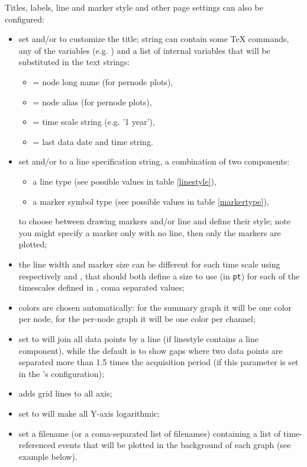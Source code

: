 Titles, labels, line and marker style and other page settings can also be configured:
\begin{itemize}
	\item set  and/or  to customize the title; string can contain some TeX commands, any of the  variables (e.g. ) and a list of internal variables that will be substituted in the text strings:
	\begin{itemize}
		\item {} = node long name (for pernode plots),
		\item {} = node alias (for pernode plots),
		\item {} = time scale string (e.g. '1 year'),
		\item {} = last data date and time string.
	\end{itemize}	
	\item set  and/or  to a line specification string, a combination of two components:
	\begin{itemize}
		\item a line type (see possible values in table \ref{linestyle}),
		\item a marker symbol type (see possible values in table \ref{markertype}),
	\end{itemize}
 to choose between drawing markers and/or line and define their style; note you might specify a marker only with no line, then only the markers are plotted;
	\item the line width and marker size can be different for each time scale using respectively  and , that should both define a size to use (in \texttt{pt}) for each of the timescales defined in
  , coma separated values;
	\item colors are chosen automatically: for the summary graph it will be one color per node, for the per-node graph it will be one color per channel;
	\item {} set to  will join all data points by a line (if linestyle contains a line component), while the default is to show gaps where two data points are separated more than 1.5 times the acquisition period (if this parameter is set in the 's configuration);
	\item {} adds grid lines to all axis;
	\item {} set to  will make all Y-axis logarithmic;
	\item {} set a filename (or a coma-separated list of filenames) containing a list of time-referenced events that will be plotted in the background of each graph (see example below).


\end{itemize}
